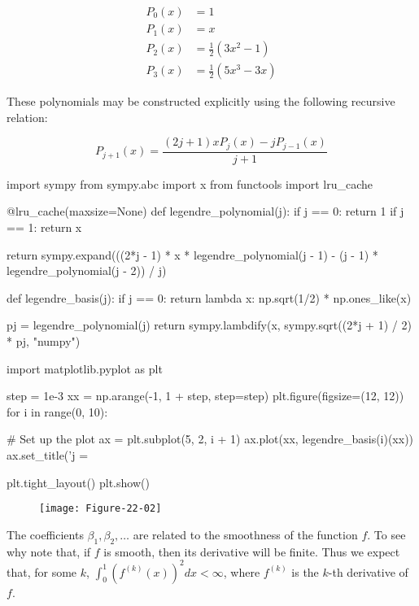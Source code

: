 \[
\begin{align}
P_0(x) &= 1 \\
P_1(x) &= x \\
P_2(x) &= \frac{1}{2}\left( 3x^2 - 1 \right) \\
P_3(x) &= \frac{1}{2}\left( 5x^3 - 3x \right)
\end{align}
\]

These polynomials may be constructed explicitly using the following
recursive relation:

\[ P_{j+1}(x) = \frac{(2j + 1) x P_j(x) - j P_{j - 1}(x)}{j + 1} \]

\begin{python}
import sympy
from sympy.abc import x
from functools import lru_cache

@lru_cache(maxsize=None)
def legendre_polynomial(j):
    if j == 0:
        return 1
    if j == 1:
        return x
    
    return sympy.expand(((2*j - 1) * x * legendre_polynomial(j - 1) - (j - 1) * legendre_polynomial(j - 2)) / j)

def legendre_basis(j):
    if j == 0:
        return lambda x: np.sqrt(1/2) * np.ones_like(x)
    
    pj = legendre_polynomial(j)
    return sympy.lambdify(x, sympy.sqrt((2*j + 1) / 2) * pj, "numpy")
\end{python}

\begin{python}
import matplotlib.pyplot as plt

step = 1e-3
xx = np.arange(-1, 1 + step, step=step)
plt.figure(figsize=(12, 12))
for i in range(0, 10):
    
    # Set up the plot
    ax = plt.subplot(5, 2, i + 1)
    ax.plot(xx, legendre_basis(i)(xx))
    ax.set_title('j = %

plt.tight_layout()
plt.show()
\end{python}

\begin{figure}[H]
\texttt{[image: Figure-22-02]}
\end{figure}

The coefficients \(\beta_1, \beta_2, \dots\) are related to the
smoothness of the function \(f\). To see why note that, if \(f\) is
smooth, then its derivative will be finite. Thus we expect that, for
some \(k\), \(\int_0^1 (f^{(k)}(x))^2 dx < \infty\), where \(f^{(k)}\)
is the \(k\)-th derivative of \(f\).

